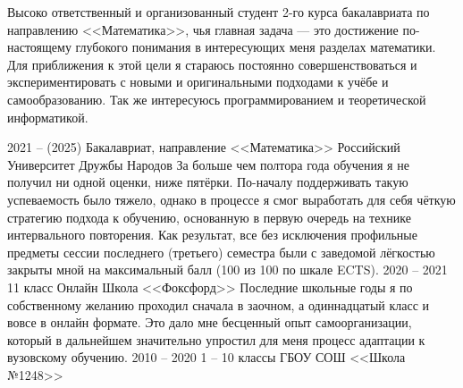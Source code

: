 \documentclass[9pt]{developercv} %
\begin{document}

\begin{minipage}[t]{0.4\textwidth} %
    Высоко ответственный и организованный студент 2-го курса бакалавриата по направлению <<Математика>>, чья главная задача --- это достижение по-настоящему глубокого понимания в интересующих меня разделах математики. Для приближения к этой цели я стараюсь постоянно совершенствоваться и экспериментировать с новыми и оригинальными подходами к учёбе и самообразованию. Так же интересуюсь программированием и теоретической информатикой.
\end{minipage}
\hfill %
\begin{minipage}[t]{0.5\textwidth} %
	\vspace{-\baselineskip} %
	\begin{barchart}{5.5}
	\end{barchart}
\end{minipage}



\begin{entrylist}
	\entry
		{2021 -- (2025)}
		{Бакалавриат, направление <<Математика>>}
		{Российский Университет Дружбы Народов}
		{За больше чем полтора года обучения я не получил ни одной оценки, ниже пятёрки. По-началу поддерживать такую успеваемость было тяжело, однако в процессе я смог выработать для себя чёткую стратегию подхода к обучению, основанную в первую очередь на технике интервального повторения. Как результат, все без исключения профильные предметы сессии последнего (третьего) семестра были с заведомой лёгкостью закрыты мной на максимальный балл (100 из 100 по шкале ECTS).}
    \entry
        {2020 -- 2021}
        {11 класс}
        {Онлайн Школа <<Фоксфорд>>}
        {Последние школьные годы я по собственному желанию проходил сначала в заочном, а одиннадцатый класс и вовсе в онлайн формате. Это дало мне бесценный опыт самоорганизации, который в дальнейшем значительно упростил для меня процесс адаптации к вузовскому обучению.}
    \entry
        {2010 -- 2020}
        {1 -- 10 классы}
        {ГБОУ СОШ <<Школа №1248>>}
        {}
\end{entrylist}
\end{document}
